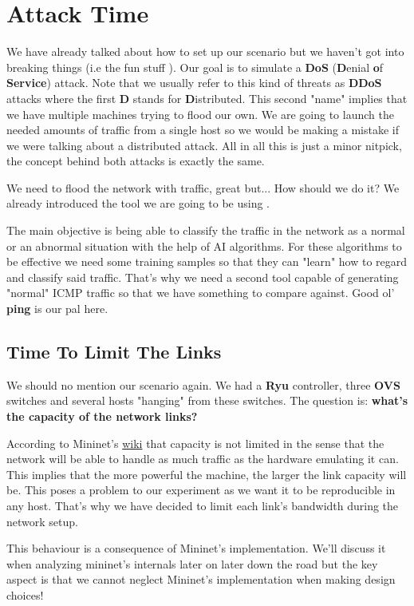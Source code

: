 \documentclass[12pt]{article}
\newcommand{\newpar} {
    \vskip 1cm
}
\begin{document}
\newpage

\section{Attack Time}
	We have already talked about how to set up our scenario but we haven't got into breaking things (i.e the fun stuff  ). Our goal is to simulate a \textbf{DoS} (\textbf{D}enial \textbf{o}f \textbf{Service}) attack. Note that we usually refer to this kind of threats as \textbf{DDoS} attacks where the first \textbf{D} stands for \textbf{D}istributed. This second "name" implies that we have multiple machines trying to flood our own. We are going to launch the needed amounts of traffic from a single host so we would be making a mistake if we were talking about a distributed attack. All in all this is just a minor nitpick, the concept behind both attacks is exactly the same.
	\newpar
	We need to flood the network with traffic, great but... How should we do it? We already introduced the tool we are going to be using .
	\newpar
	The main objective is being able to classify the traffic in the network as a normal or an abnormal situation with the help of AI algorithms. For these algorithms to be effective we need some training samples so that they can "learn" how to regard and classify said traffic. That's why we need a second tool capable of generating "normal" ICMP traffic so that we have something to compare against. Good ol' \textbf{ping} is our pal here.

	\subsection{Time To Limit The Links}
		We should no mention our scenario again. We had a \textbf{Ryu} controller, three \textbf{OVS} switches and several hosts "hanging" from these switches. The question is: \textbf{what's the capacity of the network links?}
		\newpar
		According to Mininet's \href{https://github.com/mininet/mininet/wiki/Introduction-to-Mininet}{wiki} that capacity is not limited in the sense that the network will be able to handle as much traffic as the hardware emulating it can. This implies that the more powerful the machine, the larger the link capacity will be. This poses a problem to our experiment as we want it to be reproducible in any host. That's why we have decided to limit each link's bandwidth during the network setup.
		\newpar
		This behaviour is a consequence of Mininet's implementation. We'll discuss it when analyzing mininet's internals later on later down the road but the key aspect is that we cannot neglect Mininet's implementation when making design choices!
\end{document}
